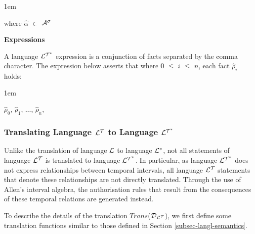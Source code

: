\documentclass[11pt]{report}
\newenvironment{vquote}
{
  \begin{list}{}{\leftmargin 1em}\item[]
}
{
  \end{list}
}
\begin{document}
\begin{itemize}
\begin{vquote}
                where
                $\hat{\alpha}$ $\in$ ${\cal A}^{\sigma}$
              \end{vquote}

            \item
              {\bf Expressions}

              A language ${\cal L^{T^*}}$ expression is a conjunction of
              facts separated by the comma character. The expression below
              asserts that where $0$ $\leq$ $i$ $\leq$ $n$, each fact
              $\hat{\rho}_i$ holds:

              \begin{vquote}
                $\hat{\rho}_0$,
                $\hat{\rho}_1$,
                $\ldots$,
                $\hat{\rho}_n$,
              \end{vquote}

          \end{itemize}

        \subsubsection{Translating Language ${\cal L^T}$ to Language ${\cal L^{T^*}}$}

          Unlike the translation of language ${\cal L}$ to language
          ${\cal L^*}$, not all statements of language ${\cal L^T}$ is
          translated to language ${\cal L^{T^*}}$. In particular, as language
          ${\cal L^{T^*}}$ does not express relationships between temporal
          intervals, all language ${\cal L^T}$ statements that denote these
          relationships are not directly translated. Through the use of Allen's
          interval algebra, the authorisation rules that result from the
          consequences of these temporal relations are generated instead.

          To describe the details of the translation $Trans$(${\cal D_{L^T}}$),
          we first define some translation functions similar to those defined
          in Section \ref{subsec-langl-semantics}.
\end{document}
